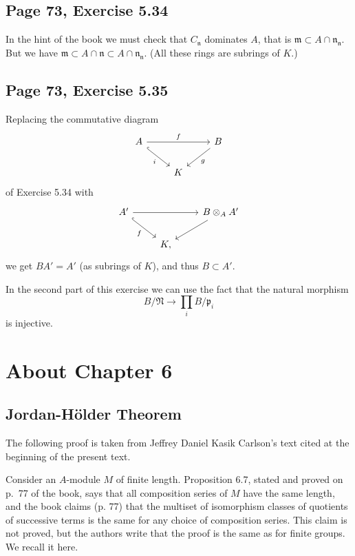 \documentclass[parskip=half,fontsize=12pt]{scrartcl}%
\newcommand{\mf}{\mathfrak}
\newcommand{\mmm}{\mf m}
\newcommand{\nnn}{\mf n}
\newcommand{\ppp}{\mf p}
\begin{document}
\subsection{Page 73, Exercise 5.34}%

In the hint of the book we must check that $C_\nnn$ dominates $A$, that is $\mmm\subset A\cap\nnn_\nnn$. But we have $\mmm\subset A\cap\nnn\subset A\cap\nnn_\nnn$. (All these rings are subrings of $K$.)

\subsection{Page 73, Exercise 5.35}%

Replacing the commutative diagram 
$$
\begin{tikzcd}
A\ar[dr,hook,"i"']\ar[rr,"f"]&&B\ar[dl,"g"]\\ 
&K
\end{tikzcd}
$$ 
of Exercise 5.34 with 
$$
\begin{tikzcd}
A'\ar[dr,hook,"f"']\ar[rr]&&B\otimes_AA'\ar[dl]\\ 
&K,
\end{tikzcd}
$$ 
we get $BA'=A'$ (as subrings of $K$), and thus $B\subset A'$.

In the second part of this exercise we can use the fact that the natural morphism 
$$
B/\mf N\to\prod_iB/\ppp_i
$$ 
is injective.

\section{About Chapter 6}%

\subsection{Jordan-Hölder Theorem}%

The following proof is taken from Jeffrey Daniel Kasik Carlson's text cited at the beginning of the present text. 

Consider an $A$-module $M$ of finite length. Proposition 6.7, stated and proved on p.~77 of the book, says that all composition series of $M$ have the same length, and the book claims (p. 77) that the multiset of isomorphism classes of quotients of successive terms is the same for any choice of composition series. This claim is not proved, but the authors write that the proof is the same as for finite groups. We recall it here. 
\end{document}

